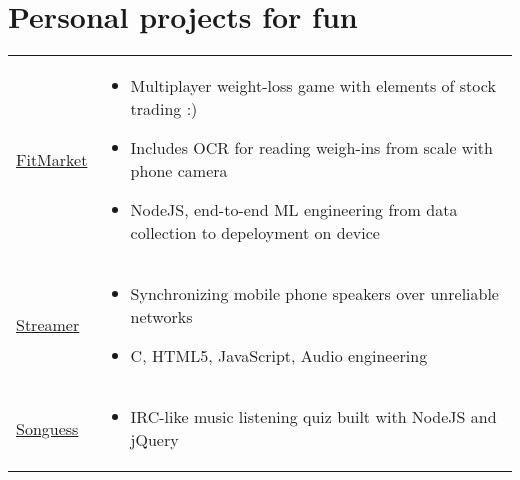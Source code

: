 \documentclass[a4paper]{article}
\makeatletter
\newlength{\tablewidth}
\newenvironment{skills}{%
\setlength{\tablewidth}{\linewidth}
\addtolength{\tablewidth}{-2\tabcolsep}
\begin{tabular}{@{}p{0.15\tablewidth}p{0.85\tablewidth}@{}}
}{%
\end{tabular}
}
\makeatother
\begin{document}
\section{Personal projects for fun}
\begin{skills}
    \href{https://github.com/agrbin/fitmarket}{FitMarket} &
    \begin{itemize}
        \item Multiplayer weight-loss game with elements of stock trading :)
        \item Includes OCR for reading weigh-ins from scale with phone camera
        \item NodeJS, end-to-end ML engineering from data collection to depeloyment on device
    \end{itemize} \\
    \href{https://github.com/agrbin/streamer}{Streamer} &
    \begin{itemize}
        \item Synchronizing mobile phone speakers over unreliable networks
        \item C, HTML5, JavaScript, Audio engineering
    \end{itemize} \\
    \href{https://github.com/agrbin/songuess}{Songuess} &
    \begin{itemize}
        \item IRC-like music listening quiz built with NodeJS and jQuery
    \end{itemize} \\
\end{skills}
\end{document}
